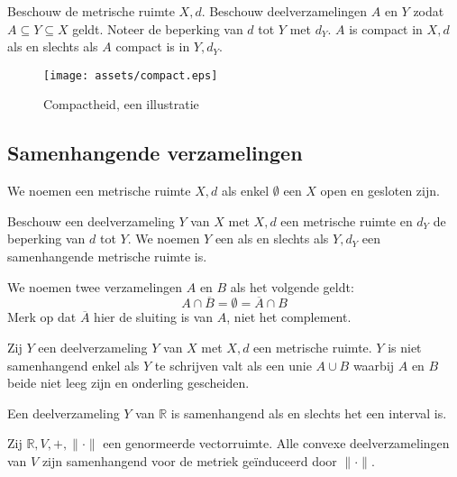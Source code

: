 \documentclass[main.tex]{subfiles}
\begin{document}
\begin{bpr}
  Beschouw de metrische ruimte $X,d$.
  Beschouw deelverzamelingen $A$ en $Y$ zodat $A \subseteq Y \subseteq X$ geldt.
  Noteer de beperking van $d$ tot $Y$ met $d_{Y}$.
  $A$ is compact in $X,d$ als en slechts als $A$ compact is in $Y,d_{Y}$.
\end{bpr}

\begin{figure}[H]
  \centering
  \texttt{[image: assets/compact.eps]}
  \caption{Compactheid, een illustratie}
  \label{fig:compactheid}
\end{figure}

\subsection{Samenhangende verzamelingen}
\label{sec:samenh-verz}

\begin{de}
  We noemen een metrische ruimte $X,d$  als enkel $\emptyset$ een $X$ open en gesloten zijn.
\end{de}

\begin{de}
  Beschouw een deelverzameling $Y$ van $X$ met $X,d$ een metrische ruimte en $d_{Y}$ de beperking van $d$ tot $Y$.
  We noemen $Y$ een  als en slechts als $Y,d_{Y}$ een samenhangende metrische ruimte is.
\end{de}
 
\begin{de}
  We noemen twee verzamelingen $A$ en $B$  als het volgende geldt:
  \[ A \cap \overline{B} = \emptyset = \overline{A} \cap B \]
  Merk op dat $\overline{A}$ hier de sluiting is van $A$, niet het complement.
\end{de}

\begin{bpr}
  Zij $Y$ een deelverzameling $Y$ van $X$ met $X,d$ een metrische ruimte.
  $Y$ is niet samenhangend enkel als $Y$ te schrijven valt als een unie $A \cup B$ waarbij $A$ en $B$ beide niet leeg zijn en onderling gescheiden.
\end{bpr}

\begin{bpr}
  Een deelverzameling $Y$ van $\mathbb{R}$ is samenhangend als en slechts het een interval is.
\end{bpr}

\begin{bpr}
  Zij $\mathbb{R},V,+, \|\cdot\|$ een genormeerde vectorruimte.
  Alle convexe deelverzamelingen van $V$ zijn samenhangend voor de metriek ge\"induceerd door $\|\cdot\|$.
\end{bpr}
\end{document}
